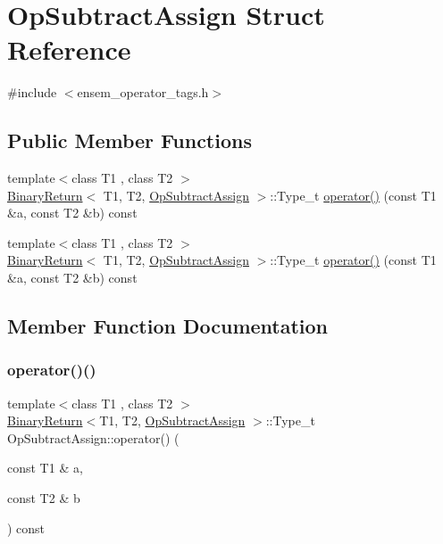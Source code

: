 \hypertarget{structOpSubtractAssign}{}\section{Op\+Subtract\+Assign Struct Reference}
\label{structOpSubtractAssign}


{\ttfamily \#include $<$ensem\+\_\+operator\+\_\+tags.\+h$>$}

\subsection*{Public Member Functions}
\begin{DoxyCompactItemize}
\item 
{\footnotesize template$<$class T1 , class T2 $>$ }\\\mbox{\hyperlink{structBinaryReturn}{Binary\+Return}}$<$ T1, T2, \mbox{\hyperlink{structOpSubtractAssign}{Op\+Subtract\+Assign}} $>$\+::Type\+\_\+t \mbox{\hyperlink{structOpSubtractAssign_aad45a22054a0f7d5a0fd7c283e84661d}{operator()}} (const T1 \&a, const T2 \&b) const
\item 
{\footnotesize template$<$class T1 , class T2 $>$ }\\\mbox{\hyperlink{structBinaryReturn}{Binary\+Return}}$<$ T1, T2, \mbox{\hyperlink{structOpSubtractAssign}{Op\+Subtract\+Assign}} $>$\+::Type\+\_\+t \mbox{\hyperlink{structOpSubtractAssign_aad45a22054a0f7d5a0fd7c283e84661d}{operator()}} (const T1 \&a, const T2 \&b) const
\end{DoxyCompactItemize}


\subsection{Member Function Documentation}
\mbox{\label{structOpSubtractAssign_aad45a22054a0f7d5a0fd7c283e84661d}} 
\subsubsection{\texorpdfstring{operator()()}{operator()()}\hspace{0.1cm}{\footnotesize\ttfamily [1/2]}}
{\footnotesize\ttfamily template$<$class T1 , class T2 $>$ \\
\mbox{\hyperlink{structBinaryReturn}{Binary\+Return}}$<$T1, T2, \mbox{\hyperlink{structOpSubtractAssign}{Op\+Subtract\+Assign}} $>$\+::Type\+\_\+t Op\+Subtract\+Assign\+::operator() (\begin{DoxyParamCaption}\item[{const T1 \&}]{a,  }\item[{const T2 \&}]{b }\end{DoxyParamCaption}) const\hspace{0.3cm}{\ttfamily [inline]}}


